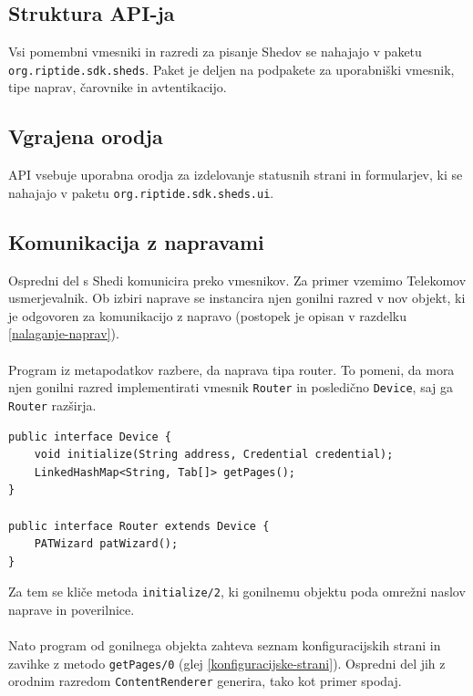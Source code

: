 \documentclass[12pt]{article}
\begin{document}
\subsection{Struktura API-ja}
Vsi pomembni vmesniki in razredi za pisanje Shedov se nahajajo v
paketu \texttt{org\-.riptide.sdk.sheds}. Paket je deljen na podpakete za
uporabniški vmesnik, tipe naprav, čarovnike in avtentikacijo.

\subsection{Vgrajena orodja}
API vsebuje uporabna orodja za izdelovanje statusnih strani in
formularjev, ki se nahajajo v paketu \texttt{org.riptide.sdk.sheds.ui}.

\subsection{Komunikacija z napravami} \label{komunikacija-z-napravami}
Ospredni del s Shedi komunicira preko vmesnikov. Za primer vzemimo
Telekomov usmerjevalnik. Ob izbiri naprave se instancira njen gonilni
razred v nov objekt, ki je odgovoren za komunikacijo z napravo
(postopek je opisan v razdelku \ref{nalaganje-naprav}).
\\\\
Program iz metapodatkov razbere, da naprava tipa router. To pomeni,
da mora njen gonilni razred implementirati vmesnik \texttt{Router} in
posledično \texttt{Device}, saj ga \texttt{Router} razširja.
\newpage

\begin{lstlisting}[style=JavaStyle]
public interface Device {
	void initialize(String address, Credential credential);
	LinkedHashMap<String, Tab[]> getPages();
}

public interface Router extends Device {
	PATWizard patWizard();
}
\end{lstlisting}
Za tem se kliče metoda \texttt{initialize/2}, ki gonilnemu objektu poda
omrežni naslov naprave in poverilnice.
\\\\
Nato program od gonilnega objekta zahteva seznam konfiguracijskih strani
in zavihke z metodo \texttt{getPages/0} (glej \ref{konfiguracijske-strani}).
Ospredni del jih z orodnim razredom \texttt{ContentRenderer} generira, tako
kot primer spodaj.
\end{document}
